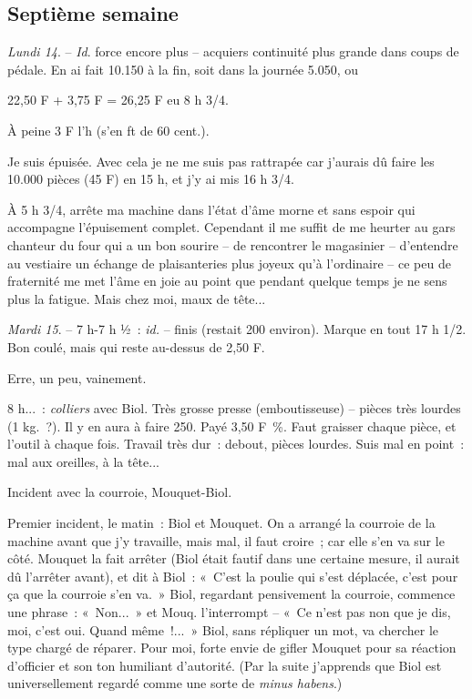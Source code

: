 \documentclass[french,twoside]{book} %
\begin{document}
\subsection[Septième semaine]{Septième semaine}
\noindent \par
{\itshape Lundi 14}. – {\itshape Id}. force encore plus – acquiers continuité plus grande dans coups de pédale. En ai fait 10.150 à la fin, soit dans la journée 5.050, ou\par
22,50 F + 3,75 F = 26,25 F eu 8 h 3/4.\par
À peine 3 F l'h (s'en ft de 60 cent.).\par
Je suis épuisée. Avec cela je ne me suis pas rattrapée car j'aurais dû faire les 10.000 pièces (45 F) en 15 h, et j'y ai mis 16 h 3/4.\par
À 5 h 3/4, arrête ma machine dans l'état d'âme morne et sans espoir qui accompagne l'épuisement complet. Cependant il me suffit de me heurter au gars chanteur du four qui a un bon sourire – de rencontrer le magasinier – d'entendre au vestiaire un échange de plaisanteries plus joyeux qu'à l'ordinaire – ce peu de fraternité me met l'âme en joie au point que pendant quelque temps je ne sens plus la fatigue. Mais chez moi, maux de tête...\par
{\itshape Mardi 15}. – 7 h-7 h ½ : {\itshape id.} – finis (restait 200 environ). Marque en tout 17 h 1/2. Bon coulé, mais qui reste au-dessus de 2,50 F.\par
Erre, un peu, vainement.\par
8 h... : {\itshape colliers} avec Biol. Très grosse presse (emboutisseuse) – pièces très lourdes (1 kg. ?). Il y en aura à faire 250. Payé 3,50 F \%. Faut graisser chaque pièce, et l'outil à chaque fois. Travail très dur : debout, pièces lourdes. Suis mal en point : mal aux oreilles, à la tête...\par
Incident avec la courroie, Mouquet-Biol.\par
Premier incident, le matin : Biol et Mouquet. On a arrangé la courroie de la machine avant que j'y travaille, mais mal, il faut croire ; car elle s'en va sur le côté. Mouquet la fait arrêter (Biol était fautif dans une certaine mesure, il aurait dû l'arrêter avant), et dit à Biol : « C'est la poulie qui s'est déplacée, c'est pour ça que la courroie s'en va. » Biol, regardant pensivement la courroie, commence une phrase : « Non... » et Mouq. l'interrompt – « Ce n'est pas non que je dis, moi, c'est oui. Quand même !... » Biol, sans répliquer un mot, va chercher le type chargé de réparer. Pour moi, forte envie de gifler Mouquet pour sa réaction d'officier et son ton humiliant d'autorité. (Par la suite j'apprends que Biol est universellement regardé comme une sorte de {\itshape minus habens}.)\par
\end{document}
